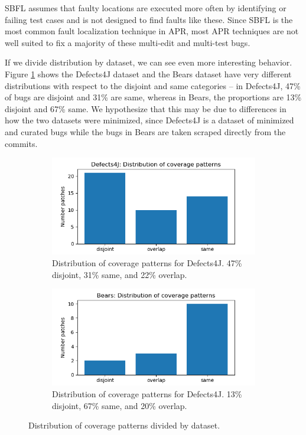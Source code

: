 SBFL assumes that faulty locations are executed more often by identifying 
or failing test cases and is not designed to find faults like these. Since SBFL 
is the most common fault localization technique in APR, most APR techniques 
are not well suited to fix a majority of these multi-edit and multi-test 
bugs.

If we divide distribution by dataset, we can see even more interesting 
behavior. Figure \ref{fig:coverage-datasets} shows the Defects4J dataset and 
the Bears dataset have very different distributions with respect to the 
disjoint and same categories -- in Defects4J, 47\% of bugs are disjoint and 
31\% are same, whereas in Bears, the proportions are 13\% disjoint and 67\% 
same. We hypothesize that this may be due to differences in how the two 
datasets were minimized, since Defects4J is a dataset of minimized and curated 
bugs while the bugs in Bears are taken scraped directly from the commits.


\begin{figure}
	\begin{subfigure}{\linewidth}
		\includegraphics[width=\linewidth]{img/coverage-d4j.png}
		\caption{Distribution of coverage patterns for Defects4J. 47\% disjoint, 31\% same, and 22\% 
		overlap.}
	\end{subfigure}
	\begin{subfigure}{\linewidth}
		\includegraphics[width=\linewidth]{img/coverage-bears.png}
		\caption{Distribution of coverage patterns for Defects4J. 13\% disjoint, 67\% same, and 20\% 
		overlap.}
	\end{subfigure}
	\caption{Distribution of coverage patterns divided by dataset.}
	\label{fig:coverage-datasets}
\end{figure}


%

